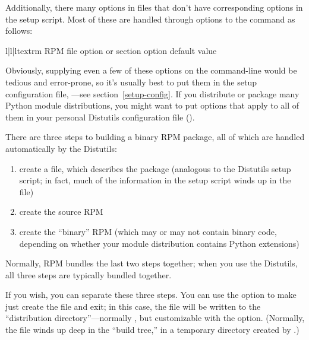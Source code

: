 \documentclass{howto}
\begin{document}
Additionally, there many options in  files that don't have
corresponding options in the setup script.  Most of these are handled
through options to the  command as follows:
\begin{tableiii}{l|l|l}{textrm}%
  {RPM  file option or section}%
  { option}%
  {default value}
\end{tableiii}
Obviously, supplying even a few of these options on the command-line
would be tedious and error-prone, so it's usually best to put them in
the setup configuration file, ---see
section~\ref{setup-config}.  If you distribute or package many Python
module distributions, you might want to put options that apply to all of
them in your personal Distutils configuration file
().

There are three steps to building a binary RPM package, all of which are 
handled automatically by the Distutils:
\begin{enumerate}
\item create a  file, which describes the package (analogous 
  to the Distutils setup script; in fact, much of the information in the 
  setup script winds up in the  file)
\item create the source RPM
\item create the ``binary'' RPM (which may or may not contain binary
  code, depending on whether your module distribution contains Python
  extensions)
\end{enumerate}
Normally, RPM bundles the last two steps together; when you use the
Distutils, all three steps are typically bundled together.

If you wish, you can separate these three steps.  You can use the
 option to make  just
create the  file and exit; in this case, the 
file will be written to the ``distribution directory''---normally
, but customizable with the 
option.  (Normally, the  file winds up deep in the ``build
tree,'' in a temporary directory created by .)
\end{document}
